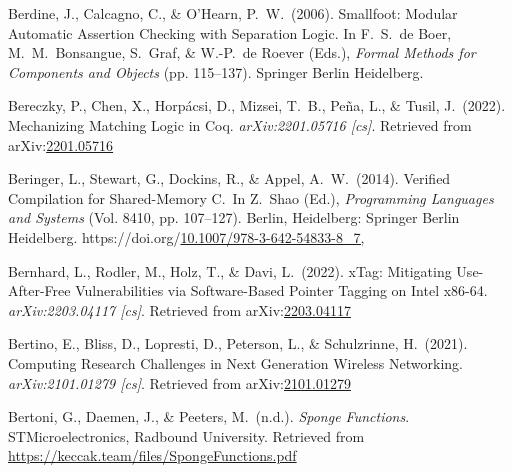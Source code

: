 \documentclass[12pt,twoside]{article}
\begin{document}
{\begin{thebibliography}{1079}
\mdbibitemlabel{}Berdine, J., Calcagno, C., \& O’Hearn, P.~W.~(2006). Smallfoot: Modular Automatic Assertion Checking with Separation Logic. In F.~S.~de Boer, M.~M.~Bonsangue, S.~Graf, \& W.-P.~de Roever (Eds.), \emph{Formal Methods for Components and Objects} (pp. 115–137). Springer Berlin Heidelberg.%

\mdbibitemlabel{}Bereczky, P., Chen, X., Horpácsi, D., Mizsei, T.~B., Peña, L., \& Tusil, J.~(2022). Mechanizing Matching Logic in Coq. \emph{arXiv:2201.05716 {}[cs]}. Retrieved from arXiv:\href{http://arxiv.org/abs/2201.05716}{2201.05716}%

\mdbibitemlabel{}Beringer, L., Stewart, G., Dockins, R., \& Appel, A.~W.~(2014). Verified Compilation for Shared-Memory C.~In Z.~Shao (Ed.), \emph{Programming Languages and Systems} (Vol. 8410, pp. 107–127). Berlin, Heidelberg: Springer Berlin Heidelberg. https://doi.org/\href{https://dx.doi.org/10.1007/978-3-642-54833-8_7,}{10.1007/978-3-642-54833-8\_7,}%

\mdbibitemlabel{}Bernhard, L., Rodler, M., Holz, T., \& Davi, L.~(2022). xTag: Mitigating Use-After-Free Vulnerabilities via Software-Based Pointer Tagging on Intel x86-64. \emph{arXiv:2203.04117 {}[cs]}. Retrieved from arXiv:\href{http://arxiv.org/abs/2203.04117}{2203.04117}%

\mdbibitemlabel{}Bertino, E., Bliss, D., Lopresti, D., Peterson, L., \& Schulzrinne, H.~(2021). Computing Research Challenges in Next Generation Wireless Networking. \emph{arXiv:2101.01279 {}[cs]}. Retrieved from arXiv:\href{http://arxiv.org/abs/2101.01279}{2101.01279}%

\mdbibitemlabel{}Bertoni, G., Daemen, J., \& Peeters, M.~(n.d.). \emph{Sponge Functions}. STMicroelectronics, Radbound University. Retrieved from \href{https://keccak.team/files/SpongeFunctions.pdf}{{\ttfamily https://\hspace{0pt}keccak.\hspace{0pt}team/\hspace{0pt}files/\hspace{0pt}SpongeFunctions.\hspace{0pt}pdf}}%


\end{thebibliography}}
\end{document}
